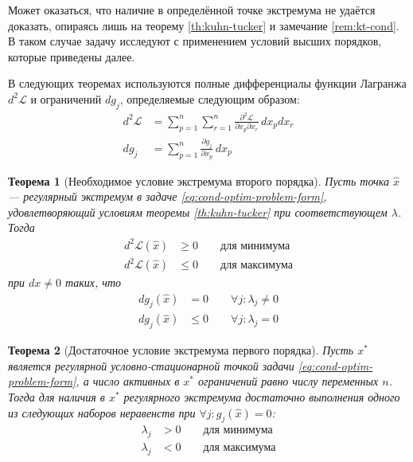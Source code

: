 \documentclass{article}
\renewcommand{\leq}{\leqslant}
\renewcommand{\geq}{\geqslant}
\newcommand{\La}{\mathcal{L}}
\newcommand{\pardiff}[2]{\frac{\partial{#1}}{\partial{#2}}}
\newcommand{\dpardiff}[3]{\frac{\partial^2{#1}}{\partial{#2}\partial{#3}}}
\newtheorem{thm}{Теорема}[section]
\theoremstyle{remark}
\theoremstyle{definition}
\numberwithin{equation}{section}
\begin{document}
Может оказаться, что наличие в определённой точке экстремума не
удаётся доказать, опираясь лишь на теорему \ref{th:kuhn-tucker} и
замечание \ref{rem:kt-cond}. В таком случае задачу исследуют с
применением условий высших порядков, которые приведены далее.

В следующих теоремах используются полные дифференциалы функции
Лагранжа $d^2\La$ и ограничений $dg_j$, определяемые следующим
образом:
\begin{align*}
  d^2\La &= \sum_{p=1}^n\sum_{r=1}^n{\dpardiff{\La}{x_p}{x_r}\,dx_pdx_r} \\
  dg_j &= \sum_{p=1}^n{\pardiff{g_j}{x_p}\,dx_p}
\end{align*}

\begin{thm}[Необходимое условие экстремума второго порядка]
  \label{th:if-extr-2}
  Пусть точка $\hat{x}$ — регулярный экстремум в задаче
  \eqref{eq:cond-optim-problem-form}, удовлетворяющий условиям теоремы
  \ref{th:kuhn-tucker} при соответствующем $\lambda$. Тогда
  \begin{align*}
    d^2\La(\hat{x}) &\geq 0 \qquad \text{для минимума} \\
    d^2\La(\hat{x}) &\leq 0 \qquad \text{для максимума}
  \end{align*}
  при $dx ≠ 0$ таких, что
  \begin{align*}
    dg_j(\hat{x}) &= 0 \qquad \forall j: \lambda_j ≠ 0\\
    dg_j(\hat{x}) &\leq 0 \qquad \forall j: \lambda_j=0
  \end{align*}
\end{thm}

\begin{thm}[Достаточное условие экстремума первого порядка]
  \label{th:then-extr-1}
  Пусть $x^*$ является регулярной условно-стационарной точкой задачи
  \eqref{eq:cond-optim-problem-form}, а число активных в $x^*$
  ограничений равно числу переменных $n$. Тогда для наличия в $x^*$
  регулярного экстремума достаточно выполнения одного из следующих
  наборов неравенств при $\forall j: g_j(\hat{x}) = 0$:
  \begin{align*}
    \lambda_j &> 0 \qquad \text{для минимума} \\
    \lambda_j &< 0 \qquad \text{для максимума}
  \end{align*}
\end{thm}
\end{document}
